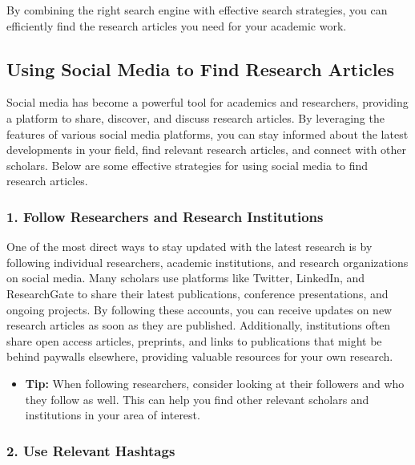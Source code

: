 \documentclass[
]{book}
\providecommand{\tightlist}{%
  \setlength{\itemsep}{0pt}\setlength{\parskip}{0pt}}
\begin{document}
By combining the right search engine with effective search strategies, you can efficiently find the research articles you need for your academic work.

\subsection*{Using Social Media to Find Research Articles}\label{using-social-media-to-find-research-articles}

Social media has become a powerful tool for academics and researchers, providing a platform to share, discover, and discuss research articles. By leveraging the features of various social media platforms, you can stay informed about the latest developments in your field, find relevant research articles, and connect with other scholars. Below are some effective strategies for using social media to find research articles.

\subsubsection*{1. Follow Researchers and Research Institutions}\label{follow-researchers-and-research-institutions}

One of the most direct ways to stay updated with the latest research is by following individual researchers, academic institutions, and research organizations on social media. Many scholars use platforms like Twitter, LinkedIn, and ResearchGate to share their latest publications, conference presentations, and ongoing projects. By following these accounts, you can receive updates on new research articles as soon as they are published. Additionally, institutions often share open access articles, preprints, and links to publications that might be behind paywalls elsewhere, providing valuable resources for your own research.

\begin{itemize}
\tightlist
\item
  \textbf{Tip:} When following researchers, consider looking at their followers and who they follow as well. This can help you find other relevant scholars and institutions in your area of interest.
\end{itemize}

\subsubsection*{2. Use Relevant Hashtags}\label{use-relevant-hashtags}
\end{document}
